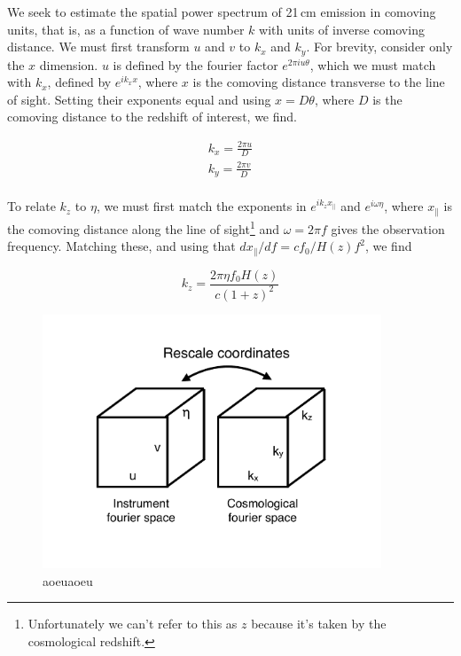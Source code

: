 We seek to estimate the spatial power spectrum of 21\,cm emission in comoving units, that is, as a function of wave number $k$ with units of inverse comoving distance. We must first transform $u$ and $v$ to $k_x$ and $k_y$. For brevity, consider only the $x$ dimension. $u$ is defined by the fourier factor $e^{2\pi i u\theta}$, which we must match with $k_x$, defined by $e^{ik_x x}$, where $x$ is the comoving distance transverse to the line of sight. Setting their exponents equal and using $x=D\theta$, where $D$ is the comoving distance to the redshift of interest, we find.

\begin{eqnarray}
	k_x=\frac{2\pi u}{D} \\ 
	k_y=\frac{2\pi v}{D} \\ 
\end{eqnarray}

To relate $k_z$ to $\eta$, we must first match the exponents in $e^{i k_z x_\parallel}$ and $e^{i\omega \eta}$, where $x_\parallel$ is the comoving distance along the line of sight\footnote{Unfortunately we can't refer to this as $z$ because it's taken by the cosmological redshift.} and $\omega=2\pi f$ gives the observation frequency. Matching these, and using that $d x_\parallel/df=cf_0/H(z)f^2$, we find

\begin{equation}
	k_z=\frac{2\pi\eta f_0 H(z)}{c(1+z)^2}
\end{equation}

\begin{figure}[h]
    \centering
    \includegraphics[width=0.9\textwidth]{chap0_intro/ifo_space_cosmo.pdf}
    \caption[Representation of the relation between image space, fourier space, and interferometer space]{aoeuaoeu}
    \label{fig:ifospacecosmo}
\end{figure}

